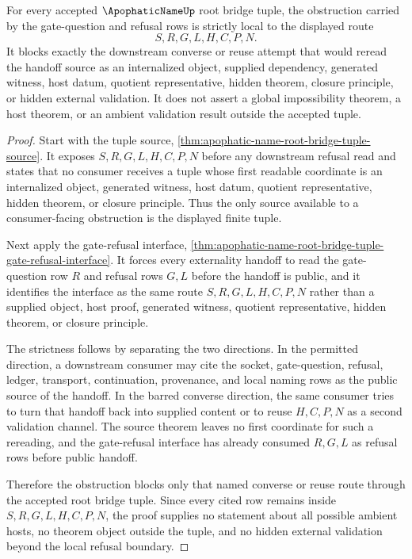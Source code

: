 \begin{corollary}
\label{cor:apophatic-name-root-bridge-tuple-source-strict-obstruction}
For every accepted $\ApophaticNameUp$ root bridge tuple, the obstruction carried by the gate-question and refusal rows is strictly local to the displayed route
$$
S,R,G,L,H,C,P,N.
$$
It blocks exactly the downstream converse or reuse attempt that would reread the handoff source as an internalized object, supplied dependency, generated witness, host datum, quotient representative, hidden theorem, closure principle, or hidden external validation. It does not assert a global impossibility theorem, a host theorem, or an ambient validation result outside the accepted tuple.
\end{corollary}
\begin{proof}
Start with the tuple source, \autoref{thm:apophatic-name-root-bridge-tuple-source}. It exposes $S,R,G,L,H,C,P,N$ before any downstream refusal read and states that no consumer receives a tuple whose first readable coordinate is an internalized object, generated witness, host datum, quotient representative, hidden theorem, or closure principle. Thus the only source available to a consumer-facing obstruction is the displayed finite tuple.

Next apply the gate-refusal interface, \autoref{thm:apophatic-name-root-bridge-tuple-gate-refusal-interface}. It forces every externality handoff to read the gate-question row $R$ and refusal rows $G,L$ before the handoff is public, and it identifies the interface as the same route $S,R,G,L,H,C,P,N$ rather than a supplied object, host proof, generated witness, quotient representative, hidden theorem, or closure principle.

The strictness follows by separating the two directions. In the permitted direction, a downstream consumer may cite the socket, gate-question, refusal, ledger, transport, continuation, provenance, and local naming rows as the public source of the handoff. In the barred converse direction, the same consumer tries to turn that handoff back into supplied content or to reuse $H,C,P,N$ as a second validation channel. The source theorem leaves no first coordinate for such a rereading, and the gate-refusal interface has already consumed $R,G,L$ as refusal rows before public handoff.

Therefore the obstruction blocks only that named converse or reuse route through the accepted root bridge tuple. Since every cited row remains inside $S,R,G,L,H,C,P,N$, the proof supplies no statement about all possible ambient hosts, no theorem object outside the tuple, and no hidden external validation beyond the local refusal boundary.
\end{proof}
